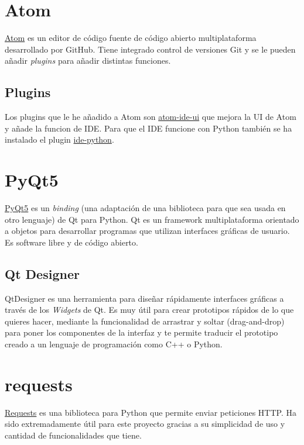 \section{Atom}

\href{https://atom.io/}{Atom} \cite{AtomSoftware2020} es un editor de código fuente de código abierto multiplataforma desarrollado por GitHub. Tiene integrado control de versiones Git y se le pueden añadir \textit{plugins} para añadir distintas funciones.

\subsection{Plugins}

Los plugins que le he añadido a Atom son \href{https://atom.io/packages/atom-ide-ui}{atom-ide-ui} que mejora la UI de Atom y añade la funcion de IDE. Para que el IDE funcione con Python también se ha instalado el plugin \href{https://atom.io/packages/ide-python}{ide-python}.

\section{PyQt5}

\href{https://doc.qt.io/qtforpython/}{PyQt5} \cite{PyQt2020} es un \textit{binding} (una adaptación de una biblioteca para que sea usada en otro lenguaje) de Qt para Python. Qt es un framework multiplataforma orientado a objetos para desarrollar programas que utilizan interfaces gráficas de usuario. Es software libre y de código abierto.

\subsection{Qt Designer}
QtDesigner \cite{QtDesignerManual} es una herramienta para diseñar rápidamente interfaces gráficas a través de los \textit{Widgets} de Qt. Es muy útil para crear prototipos rápidos de lo que quieres hacer, mediante la funcionalidad de arrastrar y soltar (drag-and-drop) para poner los componentes de la interfaz y te permite traducir el prototipo creado a un lenguaje de programación como C++ o Python.


\section{requests}

\href{https://requests.readthedocs.io/es/latest/}{Requests} es una biblioteca para Python que permite enviar peticiones HTTP. Ha sido extremadamente útil para este proyecto gracias a su simplicidad de uso y cantidad de funcionalidades que tiene.

